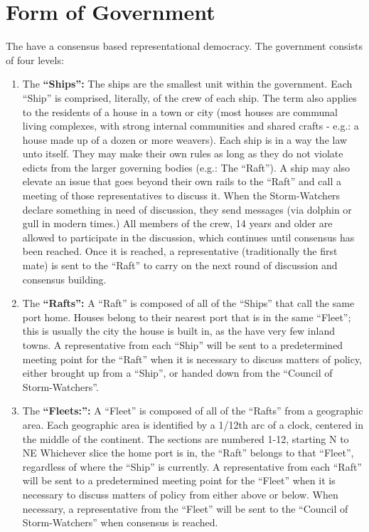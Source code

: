 \documentclass[blue]{GL2020}
\begin{document}
\section*{Form of Government} The \pShippies{} have a consensus based representational democracy. The government consists of four levels:

\begin{enumerate}	
	\item The {\bf``Ships'':} The ships are the smallest unit within the \pShip{} government. Each ``Ship'' is comprised, literally, of the crew of each ship. The term also applies to the residents of a house in a town or city (most \pShip{} houses are communal living complexes, with strong internal communities and shared crafts - e.g.: a house made up of a dozen or more weavers). Each ship is in a way the law unto itself. They may make their own rules as long as they do not violate edicts from the larger governing bodies (e.g.: The ``Raft''). A ship may also elevate an issue that goes beyond their own rails to the ``Raft'' and call a meeting of those representatives to discuss it. When the Storm-Watchers declare something in need of discussion, they send messages (via dolphin or gull in modern times.) All members of the crew, 14 years and older are allowed to participate in the discussion, which continues until consensus has been reached. Once it is reached, a representative (traditionally the first mate) is sent to the ``Raft'' to carry on the next round of discussion and consensus building.
		\item The {\bf ``Rafts'':} A ``Raft'' is composed of all of the ``Ships'' that call the same port home. Houses belong to their nearest port that is in the same ``Fleet''; this is usually the city the house is built in, as the \pShippies{} have very few inland towns. A representative from each ``Ship'' will be sent to a predetermined meeting point for the ``Raft'' when it is necessary to discuss matters of policy, either brought up from a ``Ship'', or handed down from the ``Council of Storm-Watchers''.
		\item The {\bf``Fleets:'':} A ``Fleet'' is composed of all of the ``Rafts'' from a geographic area. Each geographic area is identified by a 1/12th arc of a clock, centered in the middle of the continent. The sections are numbered 1-12, starting N to NE Whichever slice the home port is in, the ``Raft'' belongs to that ``Fleet'', regardless of where the ``Ship'' is currently. A representative from each ``Raft'' will be sent to a predetermined meeting point for the ``Fleet'' when it is necessary to discuss matters of policy from either above or below. When necessary, a representative from the ``Fleet'' will be sent to the ``Council of Storm-Watchers'' when consensus is reached.

\end{enumerate}
\end{document}
